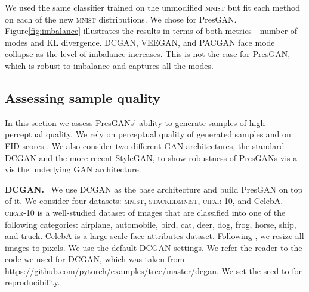 \documentclass[11pt]{article}
\DeclareRobustCommand{\parhead}[1]{\textbf{#1}~}
\begin{document}
We used the same classifier trained on the unmodified \textsc{mnist} but fit each method on each of the  new \textsc{mnist} distributions. We chose  for Pres\gls{GAN}. Figure\nobreakspace \ref {fig:imbalance} illustrates the results in terms of both metrics---number of modes and \gls{KL} divergence. \gls{DCGAN}, \acrshort{VEEGAN}, and \acrshort{PACGAN} face mode collapse as the level of imbalance increases. This is not the case for Pres\gls{GAN}, which is robust to imbalance and captures all the  modes. 

\subsection{Assessing sample quality}
\label{subsec:assessing_sample_quality}

In this section we assess Pres\glspl{GAN}' ability to generate samples of high perceptual quality. We rely on perceptual quality of generated samples and on \gls{FID} scores \citep{heusel2017gans}. We also consider two different \gls{GAN} architectures, the standard \gls{DCGAN} and the more recent Style\gls{GAN}, to show robustness of Pres\glspl{GAN} vis-a-vis the underlying \gls{GAN} architecture.

\parhead{\gls{DCGAN}.} We use \gls{DCGAN} \citep{radford2015unsupervised} as the base architecture and build Pres\gls{GAN} on top of it. We consider four datasets: \textsc{mnist}, \textsc{stackedmnist}, \textsc{cifar}-10, and CelebA. \textsc{cifar}-10 \citep{krizhevsky2009learning} is a well-studied dataset of  images that are classified into one of the following categories: airplane, automobile, bird, cat, deer, dog, frog, horse, ship, and truck. CelebA \citep{liu2015deep} is a large-scale face attributes dataset. Following \citet{radford2015unsupervised}, we resize all images to  pixels.
We use the default \gls{DCGAN} settings. We refer the reader to the code we used for \gls{DCGAN}, which was taken from \url{https://github.com/pytorch/examples/tree/master/dcgan}. We set the seed to  for reproducibility.
\end{document}
